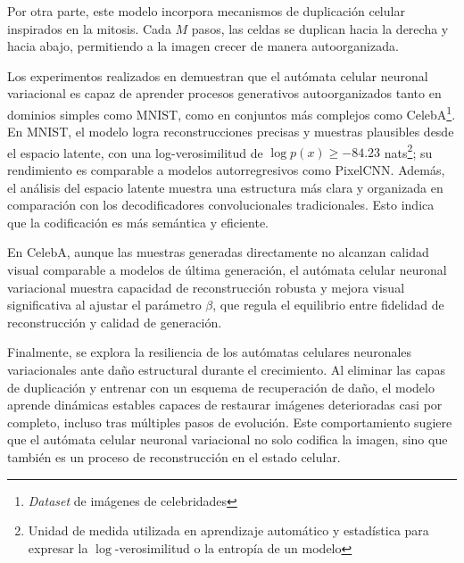 Por otra parte, este modelo incorpora mecanismos de duplicación celular inspirados en la mitosis. Cada $M$ pasos, las celdas se duplican hacia la derecha y hacia abajo, permitiendo a la imagen crecer de manera autoorganizada. 

Los experimentos realizados en \cite{VNCA} demuestran que el autómata celular neuronal variacional es capaz de aprender procesos generativos autoorganizados tanto en dominios simples como MNIST, como en conjuntos más complejos como CelebA\footnote{\textit{Dataset} de imágenes de celebridades}. En MNIST, el modelo logra reconstrucciones precisas y muestras plausibles desde el espacio latente, con una log-verosimilitud de $\log p(x) \geq -84.23$ nats\footnote{Unidad de medida utilizada en aprendizaje automático y estadística para expresar la $\log$-verosimilitud o la entropía de un modelo}; su rendimiento es comparable a modelos autorregresivos como PixelCNN. Además, el análisis del espacio latente muestra una estructura más clara y organizada en comparación con los decodificadores convolucionales tradicionales. Esto indica que la codificación es más semántica y eficiente.

En CelebA, aunque las muestras generadas directamente no alcanzan calidad visual comparable a modelos de última generación, el autómata celular neuronal variacional muestra capacidad de reconstrucción robusta y mejora visual significativa al ajustar el parámetro $\beta$, que regula el equilibrio entre fidelidad de reconstrucción y calidad de generación. 

Finalmente, se explora la resiliencia de los autómatas celulares neuronales variacionales ante daño estructural durante el crecimiento. Al eliminar las capas de duplicación y entrenar con un esquema de recuperación de daño, el modelo aprende dinámicas estables capaces de restaurar imágenes deterioradas casi por completo, incluso tras múltiples pasos de evolución. Este comportamiento sugiere que el autómata celular neuronal variacional no solo codifica la imagen, sino que también es un proceso de reconstrucción en el estado celular.


